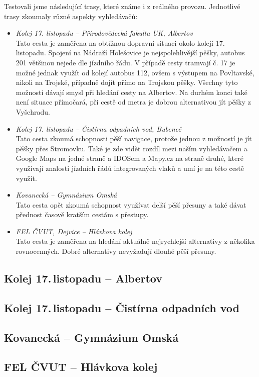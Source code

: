 Testovali jsme následující trasy, které známe i z reálného provozu. Jednotlivé
trasy zkoumaly různé aspekty vyhledávačů:
\begin{itemize}
	\item {\em Kolej 17. listopadu -- Přírodovědecká fakulta UK, Albertov}\\ Tato
	cesta je zaměřena na obtížnou dopravní situaci okolo kolejí 17.
	listopadu. Spojení na Nádraží Holešovice je nejspolehlivější pěšky,
	autobus 201 většinou nejede dle jízdního řádu. V případě cesty tramvají
	č. 17 je možné jednak využít od kolejí autobus 112, ovšem s výstupem na
	Povltavské, nikoli na Trojské, případně dojít přímo na Trojskou pěšky.
	Všechny tyto možnosti dávají smysl při hledání cesty na Albertov. Na
	durhém konci také není situace přímočará, při cestě od metra je dobrou
	alternativou jít pěšky z Vyšehradu. 
	\item {\em Kolej 17. listopadu -- Čistírna odpadních vod, Bubeneč}\\ Tato
	cesta zkoumá schopnosti pěší navigace, protože jednou z možností je jít
	pěšky přes Stromovku. Také je zde vidět rozdíl mezi naším vyhledávačem a
	Google Maps na jedné straně a IDOSem a Mapy.cz na straně druhé, které
	využívají znalosti jízdních řádů integrovaných vlaků a umí je na této
	cestě využít.
	\item {\em Kovanecká -- Gymnázium Omská}\\ Tato cesta opět zkoumá schopnost
	využívat delší pěší přesuny a také dávat přednost časově kratším cestám
	s přestupy. 
	\item {\em FEL ČVUT, Dejvice -- Hlávkova kolej}\\ Tato cesta je zaměřena na
	hledání aktuálně nejrychlejší alternativy z několika rovnocenných. Dobré
	alternativy nevyžadují dlouhé pěší přesuny.
\end{itemize}
\subsection{Kolej 17.\,listopadu -- Albertov}
\subsection{Kolej 17.\,listopadu -- Čistírna odpadních vod}
\subsection{Kovanecká -- Gymnázium Omská}
\subsection{FEL ČVUT -- Hlávkova kolej}
